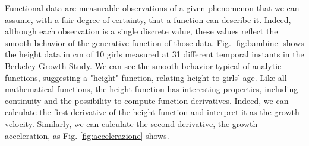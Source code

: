 Functional data are measurable observations of a given phenomenon that we can assume, with a fair degree of certainty, that a function can describe it. Indeed, although each observation is a single discrete value, these values reflect the smooth behavior of the generative function of those data. Fig. \ref{fig:bambine} shows the height data in \unit{\centi\metre} of 10 girls measured at 31 different temporal instants in the Berkeley Growth Study. We can see the smooth behavior typical of analytic functions, suggesting a "height" function, relating height to girls' age. Like all mathematical functions, the height function has interesting properties, including continuity and the possibility to compute function derivatives. Indeed, we can calculate the first derivative of the height function and interpret it as the growth velocity. Similarly, we can calculate the second derivative, the growth acceleration, as Fig. \ref{fig:accelerazione} shows.
